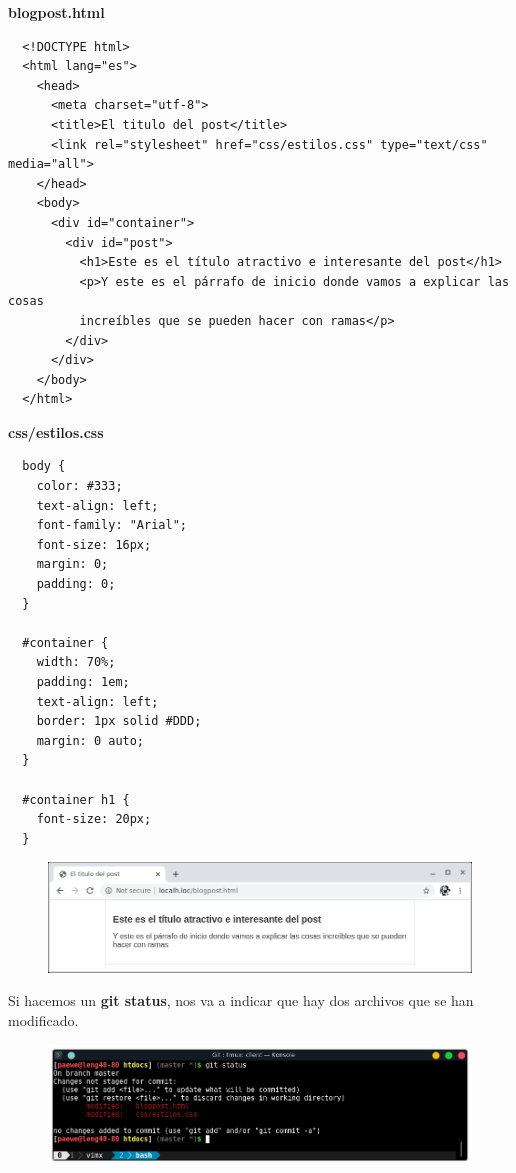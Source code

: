 \documentclass{article}
\begin{document}
\textbf{blogpost.html}
\begin{verbatim}
  <!DOCTYPE html>
  <html lang="es">
    <head>
      <meta charset="utf-8">
      <title>El titulo del post</title>
      <link rel="stylesheet" href="css/estilos.css" type="text/css" media="all">
    </head>
    <body>
      <div id="container">
        <div id="post">
          <h1>Este es el título atractivo e interesante del post</h1>
          <p>Y este es el párrafo de inicio donde vamos a explicar las cosas
          increíbles que se pueden hacer con ramas</p>
        </div>
      </div>
    </body>
  </html>
\end{verbatim}

\textbf{css/estilos.css}
\begin{verbatim}
  body {
    color: #333;
    text-align: left;
    font-family: "Arial";
    font-size: 16px;
    margin: 0;
    padding: 0;
  }

  #container {
    width: 70%;
    padding: 1em;
    text-align: left;
    border: 1px solid #DDD;
    margin: 0 auto;
  }

  #container h1 {
    font-size: 20px;
  }
\end{verbatim}

\newpage

\begin{figure}[h!]
  \centering
  \includegraphics[scale=0.75]{./Pictures/130_cambios.png}
\end{figure}

Si hacemos un \textbf{git status}, nos va a indicar que hay dos archivos que se
han modificado.

\begin{figure}[h!]
  \centering
  \includegraphics[scale=0.75]{./Pictures/131_status.png}
\end{figure}
\end{document}
